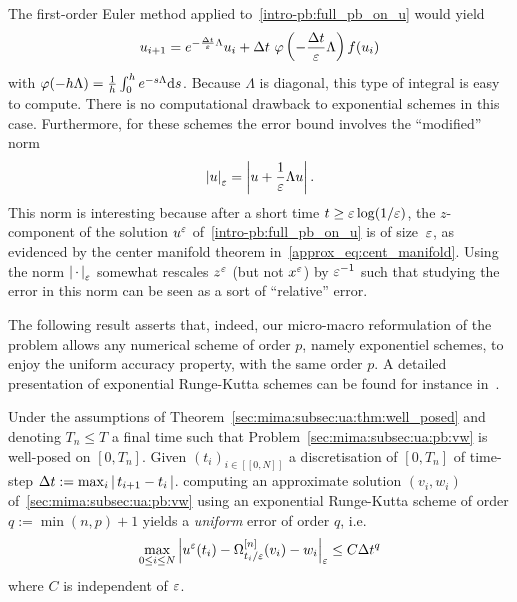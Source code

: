 The first-order Euler method applied to~\eqref{intro-pb:full_pb_on_u} would yield 
\begin{equation*}
u_{i+1} = e^{- \frac{\Delta t}{\varepsilon} \Lambda} u_i + \Delta t\ \varphi \left( -\frac{\Delta t}{\varepsilon} \Lambda \right) f(u_i) 
\end{equation*}
with $\varphi(-h \Lambda) = \frac{1}{h} \int_0^h e^{-s \Lambda} \mathrm{d} s$. 
Because $\Lambda$ is diagonal, this type of integral is easy to compute. 
There is no computational drawback to exponential schemes in this case. 
%
Furthermore, for these schemes the error bound involves the ``modified'' norm 
\begin{equation} \label{mima_def:modnorm}
\left\vert u \right\vert _{\varepsilon} = \left | u + \frac{1}{\varepsilon} \Lambda u \right | . 
\end{equation}
This norm is interesting because after a short time $t \geq \varepsilon \log(1/\varepsilon)$, 
the $z$-component of the solution $u^{\varepsilon}$ of~\eqref{intro-pb:full_pb_on_u} 
is of size~$\varepsilon$, as evidenced by the center manifold theorem 
in~\eqref{approx_eq:cent_manifold}. 
%
Using the norm $ \left\vert \, \cdot \,  \right\vert _{\varepsilon} $ somewhat rescales $ z^{\varepsilon} $ (but not $x^{\varepsilon}$) by $\varepsilon^{-1}$ 
such that studying the error in this norm can be seen as a sort of ``relative'' error. 

The following result  asserts that, indeed, our micro-macro reformulation of the problem allows any numerical scheme of order $p$, namely exponentiel schemes,  to enjoy the uniform accuracy property, with the same order $p$. A detailed presentation of exponential Runge-Kutta schemes 
can be found for instance in~\cite{hochbruck.2005.explicit,hochbruck.2004.exponential}. 

\begin{theorem} \label{sec:mima:subsec:ua:thm:ua}
Under the assumptions of Theorem~\ref{sec:mima:subsec:ua:thm:well_posed} 
and denoting $T_n \leq T$ a final time such that 
Problem~\eqref{sec:mima:subsec:ua:pb:vw} is well-posed on $[0, T_n]$. 
Given $(t_i)_{i\in [\![0,N ]\!]}$ a discretisation of $[0,T_n]$ of time-step $\Delta t := \max_i |\, t_{i+1} - t_i \, |$. 
computing an approximate solution $(v_i, w_i)$ of~\eqref{sec:mima:subsec:ua:pb:vw} 
using an exponential Runge-Kutta scheme of order $q := \min(n,p)+1$ yields a 
\textit{uniform} error of order $q$, i.e. 
\begin{equation} \label{mima_eq:unif_abs_err}
\max_{0 \leq i \leq N} \left\vert  u^{\varepsilon}(t_i) - \Omega^{[n]}_{t_i/\varepsilon}(v_i) - w_i  \right\vert _{\varepsilon} \leq C \Delta t ^{q} 
\end{equation}
where $C$ is independent of $\varepsilon$. 
\end{theorem}

